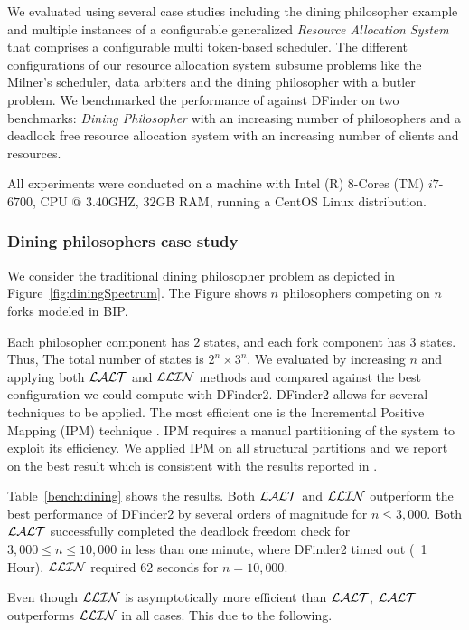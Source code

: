 We evaluated \deadlocktool{} using several case studies including the dining philosopher example and multiple instances
of a configurable generalized {\em Resource Allocation System} that comprises 
a configurable multi token-based scheduler.
The different configurations of our resource allocation system subsume problems like the Milner's scheduler, 
data arbiters and the dining philosopher with a butler problem. 
We benchmarked the performance of \deadlocktool{} against DFinder on two benchmarks: 
{\em Dining Philosopher} with an increasing number of philosophers and 
a deadlock free resource allocation system with an increasing number of clients and resources. 

All experiments were conducted on a machine with Intel (R) $8$-Cores (TM) $i7$-$6700$, CPU @ $3.40$GHZ, $32$GB RAM, 
running a CentOS Linux distribution. 

\subsubsection{Dining philosophers case study} 
We consider the traditional dining philosopher problem as depicted in 
Figure~\ref{fig:diningSpectrum}.
The Figure shows $n$ philosophers competing on $n$ forks modeled in BIP. 

Each philosopher component has $2$ states, and each fork component has $3$ states. 
Thus, The total number of states is $2^n \times 3^n$. 
We evaluated \deadlocktool{} by increasing $n$ and applying both $\mathcal{LALT}$ and $\mathcal{LLIN}$ methods and compared against the best configuration 
we could compute with DFinder2. 
DFinder2 allows for several techniques to be applied. The most efficient one is 
the Incremental Positive Mapping (IPM) technique \cite{DFinder2}. 
IPM requires a manual partitioning of the system to exploit its efficiency. 
We applied IPM on all structural partitions and we report on the best result which is consistent 
with the results reported in \cite{DFinder2}. 

Table~\ref{bench:dining} shows the results. Both $\mathcal{LALT}$ and $\mathcal{LLIN}$ outperform the best performance of DFinder2 by several orders of magnitude 
for $n\leq 3,000$. Both $\mathcal{LALT}$ successfully completed the deadlock freedom check for $3,000 \leq n \leq 10,000$ 
in less than one minute, where DFinder2 timed out (~1 Hour). $\mathcal{LLIN}$ required $62$ seconds for $n=10,000$. 


Even though $\mathcal{LLIN}$ is asymptotically more efficient than $\mathcal{LALT}$,
$\mathcal{LALT}$ outperforms $\mathcal{LLIN}$ in all cases. This due to the following. 

